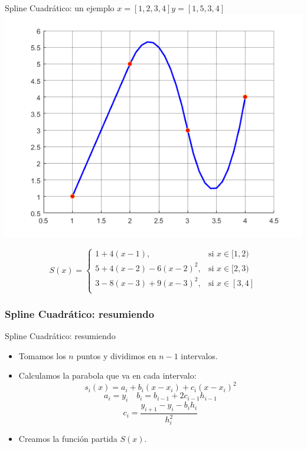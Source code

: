 \documentclass[xcolor=svgnames]{beamer} %
\theoremstyle{plain}
\theoremstyle{definition}
\begin{document}
\begin{frame}{Spline Cuadrático: un ejemplo}
  $x= [1, 2, 3, 4]$\hspace{10pt}$y=[1, 5, 3, 4]$ 
    \includegraphics[width=.45\linewidth]{splineCuad/splineLin.png}  

  \begin{tcolorbox}
	$$S(x) = \left\{
	\begin{array}{cc}
	  1 + 4(x-1) ,& \text{si } x \in [1,2) \\
	  5 +4(x-2)-6(x-2)^2 ,& \text{si } x \in [2,3) \\
	  3 - 8(x-3)+9(x-3)^2  ,& \text{si } x \in [3,4] \\
	\end{array} \right.$$		
  \end{tcolorbox}
\end{frame}

\subsubsection{Spline Cuadrático: resumiendo}
\begin{frame}{Spline Cuadrático: resumiendo}
	\begin{itemize}
	\item Tomamos los $n$ puntos y dividimos en $n-1$ intervalos.\pause
	\item Calculamos la parabola que va en cada intervalo:\pause
	$$s_i(x) = a_i + b_i(x-x_i) + c_i(x-x_i)^2  $$\pause
	$$\boxed{a_i = y_i} \quad \boxed{b_i = b_{i-1}+2c_{i-1}h_{i-1}}$$
	$$\boxed{c_i = \frac{y_{i+1}-y_i-b_ih_i}{h_i^2}} $$\pause
	\item Creamos la función partida $S(x)$.
	\end{itemize}

\end{frame}
\end{document}
